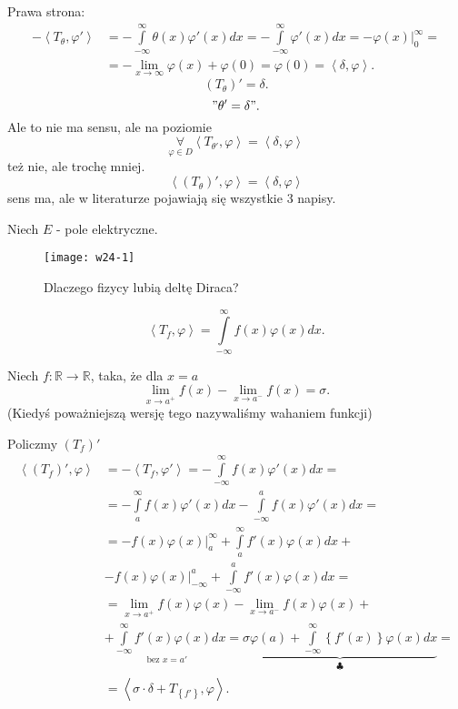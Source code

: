 \documentclass[../main.tex]{subfiles}
\begin{document}
Prawa strona:
\begin{align*}
    -\left<T_\theta, \varphi' \right> &= -\int\limits_{-\infty}^{\infty} \theta(x)\varphi'(x)dx = -\int\limits_{-\infty}^{\infty} \varphi'(x)dx = -\varphi(x)\Big|_{0}^{\infty} =\\
    &= - \lim_{x \to \infty}\varphi(x) + \varphi(0) = \varphi(0) = \left<\delta, \varphi \right>
.\end{align*}
\[
    \left( T_\theta \right)' = \delta
.\]
\[
    "\theta' = \delta"
.\]
Ale to nie ma sensu, ale na poziomie
\[
\underset{\varphi\in D}{\forall}     \left<T_{\theta'},\varphi \right> = \left<\delta, \varphi \right>
\]
też nie, ale trochę mniej.
\[
    \left<\left( T_{\theta} \right)', \varphi \right> = \left<\delta, \varphi \right>
\]
sens ma, ale w literaturze pojawiają się wszystkie 3 napisy.
\begin{przyklad}
Niech $E$ - pole elektryczne.
\begin{figure}[h]
    \centering
    \texttt{[image: w24-1]}
    \caption{Dlaczego fizycy lubią deltę Diraca?}
    \label{fig:w24-1}
\end{figure}
\[
    \left<T_f, \varphi \right> = \int\limits_{-\infty}^{\infty} f(x)\varphi(x)dx
.\]
\end{przyklad}
\begin{definicja}
    Niech $f: \mathbb{R}\to \mathbb{R}$, taka, że dla $x = a$
    \[
        \lim_{x \to a^+} f(x) - \lim_{x \to a^-}f(x) = \sigma
    .\]
(Kiedyś poważniejszą wersję tego nazywaliśmy wahaniem funkcji)
\end{definicja}
Policzmy $\left( T_f \right)'$
\begin{align*}
    \left<\left( T_f \right)', \varphi \right> &= -\left<T_f, \varphi' \right> = -\int\limits_{-\infty}^{\infty} f(x)\varphi'(x)dx =\\
    &=-\int\limits_{a}^{\infty} f(x)\varphi'(x)dx - \int\limits_{-\infty}^{a} f(x)\varphi'(x)dx =\\
    &= -f(x)\varphi(x)\Big|_{a}^\infty  + \int\limits_{a}^{\infty} f'(x)\varphi(x)dx +\\
    &- f(x)\varphi(x)\Big|_{-\infty}^a + \int\limits_{-\infty}^{a} f'(x)\varphi(x)dx  =\\
    &= \lim_{x \to a^+}f(x)\varphi(x) - \lim_{x \to a^-}f(x)\varphi(x) +\\
    &+ \underset{\text{bez $x = a'$ }}{\int\limits_{-\infty}^{\infty} f'(x)\varphi(x)dx} = \underbrace{\sigma \varphi(a) + \int\limits_{-\infty}^{\infty} \left\{ f'(x) \right\} \varphi(x)dx}_{\clubsuit} = \\
    &= \left<\sigma \cdot \delta + T_{\left\{ f' \right\} }, \varphi \right>
.\end{align*}
\end{document}
